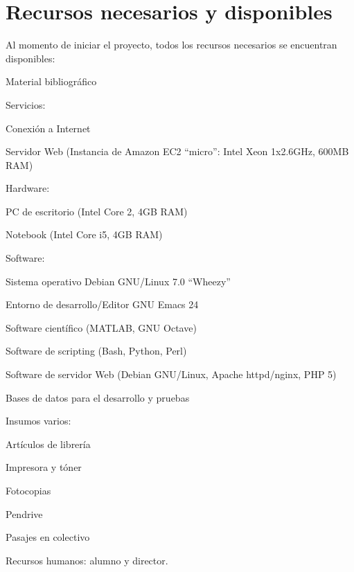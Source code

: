\documentclass[12pt,bibliography=openstyle,DIV=12,parskip=full-]{scrartcl}
\begin{document}
\section{Recursos necesarios y disponibles}
Al momento de iniciar el proyecto, todos los recursos necesarios se
encuentran disponibles:
\begin{itemize*}
\item Material bibliográfico
\item Servicios:
  \begin{itemize*}
  \item Conexión a Internet
  \item Servidor Web (Instancia de Amazon EC2 ``micro'': Intel Xeon
    1x2.6GHz, 600MB RAM)
  \end{itemize*}
\item Hardware:
  \begin{itemize*}
  \item PC de escritorio (Intel Core 2, 4GB RAM)
  \item Notebook (Intel Core i5, 4GB RAM)
  \end{itemize*}
\item Software:
  \begin{itemize*}
  \item Sistema operativo Debian GNU/Linux 7.0 ``Wheezy''
  \item Entorno de desarrollo/Editor GNU Emacs 24
  \item Software científico (MATLAB, GNU Octave)
  \item Software de scripting (Bash, Python, Perl)
  \item Software de servidor Web (Debian GNU/Linux, Apache
    httpd/nginx, PHP 5)
  \end{itemize*}
\item Bases de datos para el desarrollo y pruebas
\item Insumos varios:
  \begin{itemize*}
  \item Artículos de librería
  \item Impresora y tóner
  \item Fotocopias
  \item Pendrive
  \item Pasajes en colectivo
  \end{itemize*}
\item Recursos humanos: alumno y director.
\end{itemize*}
%
%
\newpage
\end{document}
